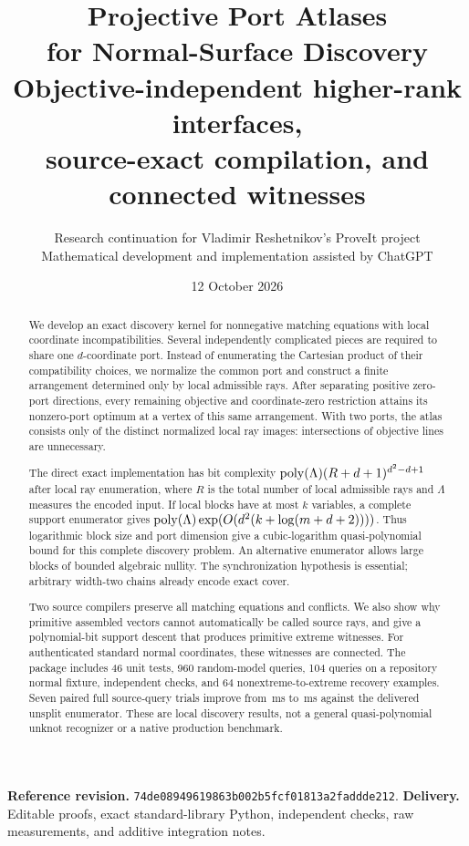 \documentclass[11pt,a4paper]{article}
\title{\textbf{Projective Port Atlases\\for Normal-Surface Discovery}\\[7pt]
\large Objective-independent higher-rank interfaces,\\source-exact compilation, and connected witnesses}
\author{Research continuation for Vladimir Reshetnikov's ProveIt project\\
\small Mathematical development and implementation assisted by ChatGPT}
\date{12 October 2026}
\theoremstyle{definition}
\theoremstyle{remark}
\newcommand{\pin}{\texttt{74de08949619863b002b5fcf01813a2faddde212}}
\begin{document}
\maketitle
\begin{abstract}
We develop an exact discovery kernel for nonnegative matching equations with local coordinate incompatibilities. Several independently complicated pieces are required to share one $d$-coordinate port. Instead of enumerating the Cartesian product of their compatibility choices, we normalize the common port and construct a finite arrangement determined only by local admissible rays. After separating positive zero-port directions, every remaining objective and coordinate-zero restriction attains its nonzero-port optimum at a vertex of this same arrangement. With two ports, the atlas consists only of the distinct normalized local ray images: intersections of objective lines are unnecessary.

The direct exact implementation has bit complexity $\operatorname{poly}(\Lambda)(R+d+1)^{d^2-d+1}$ after local ray enumeration, where $R$ is the total number of local admissible rays and $\Lambda$ measures the encoded input. If local blocks have at most $k$ variables, a complete support enumerator gives $\operatorname{poly}(\Lambda)\exp(O(d^2(k+\log(m+d+2))))$. Thus logarithmic block size and port dimension give a cubic-logarithm quasi-polynomial bound for this complete discovery problem. An alternative enumerator allows large blocks of bounded algebraic nullity. The synchronization hypothesis is essential; arbitrary width-two chains already encode exact cover.

Two source compilers preserve all matching equations and conflicts. We also show why primitive assembled vectors cannot automatically be called source rays, and give a polynomial-bit support descent that produces primitive extreme witnesses. For authenticated standard normal coordinates, these witnesses are connected. The package includes 46 unit tests, 960 random-model queries, 104 queries on a repository normal fixture, independent checks, and 64 nonextreme-to-extreme recovery examples. Seven paired full source-query trials improve from \NormalBase\,ms to \NormalSplit\,ms against the delivered unsplit enumerator. These are local discovery results, not a general quasi-polynomial unknot recognizer or a native production benchmark.
\end{abstract}
\vspace{5pt}
\noindent\textbf{Reference revision.} \pin.\quad
\textbf{Delivery.} Editable proofs, exact standard-library Python, independent checks, raw measurements, and additive integration notes.
\end{document}
